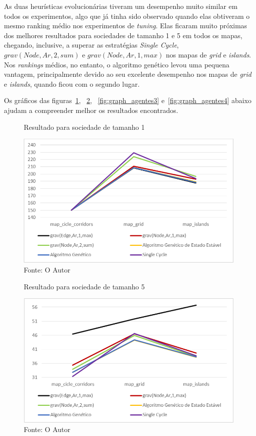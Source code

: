 As duas heurísticas evolucionárias tiveram um desempenho muito similar em 
todos os experimentos, algo que já tinha sido observado quando elas obtiveram 
o mesmo ranking médio nos experimentos de \textit{tuning}. Elas ficaram muito 
próximas dos melhores resultados para sociedades de tamanho 1 e 5 em todos os 
mapas, chegando, inclusive, a superar as estratégias \textit{Single Cycle}, 
$grav(Node,Ar,2,sum)$ e $grav(Node,Ar,1,max)$ nos mapas de \textit{grid} e 
\textit{islands}. Nos \textit{rankings} médios, no entanto, o 
algoritmo genético levou uma pequena vantagem, principalmente devido ao seu 
excelente desempenho nos mapas de \textit{grid} e \textit{islands}, quando 
ficou com o segundo lugar.

Os gráficos das figuras~\ref{fig:graph_agentes1}, ~\ref{fig:graph_agentes2}, 
~\ref{fig:graph_agentes3} e~\ref{fig:graph_agentes4} abaixo ajudam a 
compreender melhor os resultados encontrados.

\begin{figure}[H]
	\caption[Resultado para sociedade de tamanho 1]{Resultado para sociedade 
		de tamanho 1}
	\centering
	\includegraphics[width=\columnwidth]{images/graph_agent1.png}
	\caption*{Fonte: O Autor}
	\label{fig:graph_agentes1}
\end{figure}

\begin{figure}[H]
	\caption[Resultado para sociedade de tamanho 5]{Resultado para sociedade 
		de tamanho 5}
	\centering
	\includegraphics[width=\columnwidth]{images/graph_agent2.png}
	\caption*{Fonte: O Autor}
	\label{fig:graph_agentes2}
\end{figure}

